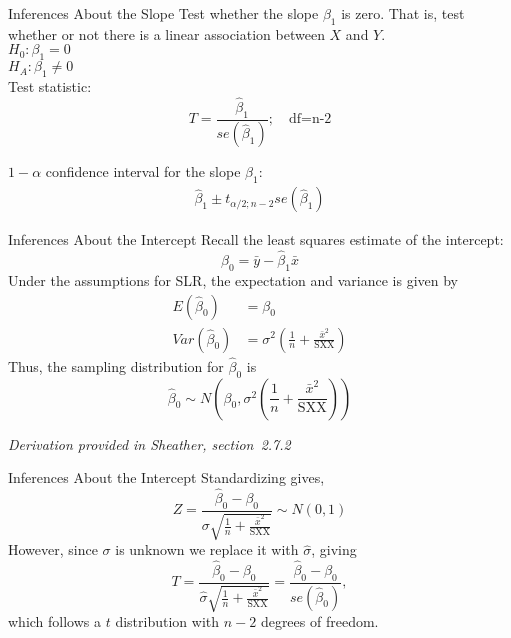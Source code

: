 \documentclass[10pt]{beamer}
\begin{document}
\begin{frame}{Inferences About the Slope}
Test whether the slope $\beta_1$ is zero.  That is, test whether or not there is a linear association between $X$ and $Y$.\\
\vspace{10pt}
$H_0: \beta_1 = 0$\\
$H_A: \beta_1 \neq 0$\\
\vspace{10pt}
Test statistic:
$$T = \frac{\hat{\beta}_1}{se(\hat{\beta}_1)}; \quad \text{df=n-2}$$
\vspace{15pt}

$1-\alpha$ confidence interval for the slope $\beta_1$:
\begin{align*}
\hat{\beta}_1 \pm t_{\alpha/2; n-2} se(\hat{\beta}_1)
\end{align*}
\end{frame}

\begin{frame}{Inferences About the Intercept}
Recall the least squares estimate of the intercept:
$$\hat{\beta}_0 = \bar{y} - \hat{\beta}_1 \bar{x}$$
Under the assumptions for SLR, the expectation and variance is given by
\begin{align*}
E(\hat{\beta}_0) &= \beta_0\\
Var(\hat{\beta}_0) &= \sigma^2 \left( \frac{1}{n} + \frac{\bar{x}^2}{\text{SXX}} \right)
\end{align*}
Thus, the sampling distribution for $\hat{\beta}_0$ is
$$\hat{\beta}_0 \sim N \left(\beta_0, \sigma^2 \left( \frac{1}{n} + \frac{\bar{x}^2}{\text{SXX}} \right) \right)$$
\vspace{10pt}

\emph{Derivation provided in Sheather, section~2.7.2}
\end{frame}

\begin{frame}{Inferences About the Intercept}
Standardizing gives,
$$Z = \frac{\hat{\beta}_0 - \beta_0}{\sigma \sqrt{\frac{1}{n} + \frac{\bar{x}^2}{\text{SXX}} }} \sim N(0,1)$$
However, since $\sigma$ is unknown we replace it with $\hat{\sigma}$, giving
$$ T= \frac{\hat{\beta}_0 - \beta_0}{\hat{\sigma} \sqrt{\frac{1}{n} + \frac{\bar{x}^2}{\text{SXX}} }} = \frac{\hat{\beta}_0 - \beta_0}{se(\hat{\beta}_0)}, $$
which follows a $t$ distribution with $n-2$ degrees of freedom.
\end{frame}
\end{document}
